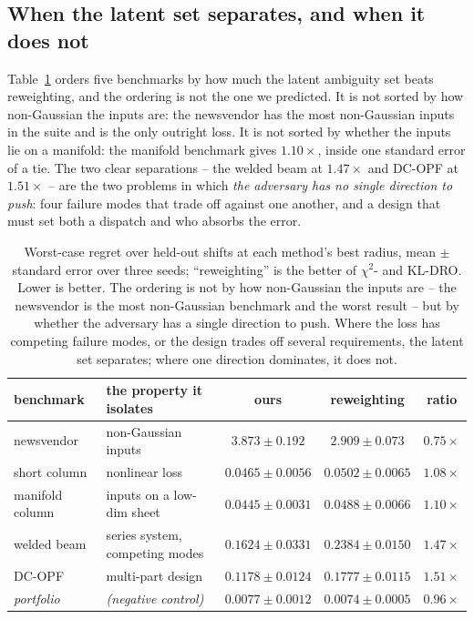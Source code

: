 \documentclass[11pt]{article}
\begin{document}
\subsection{When the latent set separates, and when it does not}
\label{sec:when}

Table~\ref{tab:results} orders five benchmarks by how much the latent ambiguity set beats
reweighting, and the ordering is not the one we predicted. It is not sorted by how
non-Gaussian the inputs are: the newsvendor has the most non-Gaussian inputs in the suite
and is the only outright loss. It is not sorted by whether the inputs lie on a manifold: the
manifold benchmark gives $1.10\times$, inside one standard error of a tie. The two clear
separations -- the welded beam at $1.47\times$ and DC-OPF at $1.51\times$ -- are the two
problems in which \emph{the adversary has no single direction to push}: four failure modes
that trade off against one another, and a design that must set both a dispatch and who
absorbs the error.

\begin{table}[h]
\centering
\small
\begin{tabular}{llccc}
\toprule
benchmark & the property it isolates & ours & reweighting & ratio \\
\midrule
newsvendor       & non-Gaussian inputs           & $3.873 \pm 0.192$ & $\mathbf{2.909 \pm 0.073}$ & $0.75\times$ \\
short column     & nonlinear loss                & $\mathbf{0.0465 \pm 0.0056}$ & $0.0502 \pm 0.0065$ & $1.08\times$ \\
manifold column  & inputs on a low-dim sheet     & $\mathbf{0.0445 \pm 0.0031}$ & $0.0488 \pm 0.0066$ & $1.10\times$ \\
welded beam      & series system, competing modes & $\mathbf{0.1624 \pm 0.0331}$ & $0.2384 \pm 0.0150$ & $1.47\times$ \\
DC-OPF           & multi-part design             & $\mathbf{0.1178 \pm 0.0124}$ & $0.1777 \pm 0.0115$ & $1.51\times$ \\
\midrule
\emph{portfolio} & \emph{(negative control)}     & $0.0077 \pm 0.0012$ & $0.0074 \pm 0.0005$ & $0.96\times$ \\
\bottomrule
\end{tabular}
\caption{Worst-case regret over held-out shifts at each method's best radius, mean $\pm$
standard error over three seeds; ``reweighting'' is the better of $\chi^2$- and KL-DRO.
Lower is better. The ordering is not by how non-Gaussian the inputs are -- the newsvendor
is the most non-Gaussian benchmark and the worst result -- but by whether the adversary
has a single direction to push. Where the loss has competing failure modes, or the design
trades off several requirements, the latent set separates; where one direction dominates,
it does not.}
\label{tab:results}
\end{table}
\end{document}
